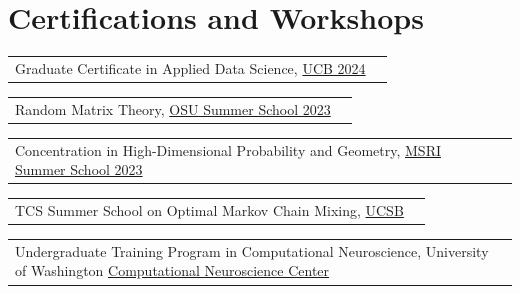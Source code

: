 \section{\sc Certifications and Workshops}


\begin{tabular}{@{}p{3.55in}p{1.25in}}
 Graduate Certificate in Applied Data Science, \href{https://www.ischool.berkeley.edu/programs/data-science-certificate}{UCB 2024} & \\
\end{tabular}

\begin{tabular}{@{}p{3.55in}p{1.25in}}
 Random Matrix Theory, \href{https://sites.google.com/colorado.edu/rmt-and-applications/home}{OSU Summer School 2023} & \\
\end{tabular}


\begin{tabular}{@{}p{3.55in}p{1.25in}}
 Concentration in High-Dimensional Probability and Geometry, \href{https://www.slmath.org/summer-schools/1036#overview_summer_graduate_school}{MSRI Summer School 2023} & \\
\end{tabular}

\begin{tabular}{@{}p{3.55in}p{1.25in}}
TCS Summer School on Optimal Markov Chain Mixing, \href{https://sites.cs.ucsb.edu/~vigoda/School/program.html}{UCSB} & \\
\end{tabular}

\begin{tabular}{@{}p{3.55in}p{1.25in}}
Undergraduate Training Program in Computational Neuroscience, University of Washington \href{https://compneuro.washington.edu/}{Computational Neuroscience Center} & \\
\end{tabular}






\endinput
